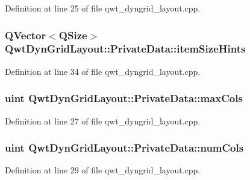 Definition at line 25 of file qwt\-\_\-dyngrid\-\_\-layout.\-cpp.

\hypertarget{class_qwt_dyn_grid_layout_1_1_private_data_a40a22ad097c8a0698439fbe272b32439}{
\subsubsection[{item\-Size\-Hints}]{\setlength{\rightskip}{0pt plus 5cm}Q\-Vector$<$Q\-Size$>$ Qwt\-Dyn\-Grid\-Layout\-::\-Private\-Data\-::item\-Size\-Hints}}\label{class_qwt_dyn_grid_layout_1_1_private_data_a40a22ad097c8a0698439fbe272b32439}


Definition at line 34 of file qwt\-\_\-dyngrid\-\_\-layout.\-cpp.

\hypertarget{class_qwt_dyn_grid_layout_1_1_private_data_a7c8835b9a956abc986d126e782d8010f}{
\subsubsection[{max\-Cols}]{\setlength{\rightskip}{0pt plus 5cm}uint Qwt\-Dyn\-Grid\-Layout\-::\-Private\-Data\-::max\-Cols}}\label{class_qwt_dyn_grid_layout_1_1_private_data_a7c8835b9a956abc986d126e782d8010f}


Definition at line 27 of file qwt\-\_\-dyngrid\-\_\-layout.\-cpp.

\hypertarget{class_qwt_dyn_grid_layout_1_1_private_data_a018d57fd3e0995fdbec3782f68817e4c}{
\subsubsection[{num\-Cols}]{\setlength{\rightskip}{0pt plus 5cm}uint Qwt\-Dyn\-Grid\-Layout\-::\-Private\-Data\-::num\-Cols}}\label{class_qwt_dyn_grid_layout_1_1_private_data_a018d57fd3e0995fdbec3782f68817e4c}


Definition at line 29 of file qwt\-\_\-dyngrid\-\_\-layout.\-cpp.

